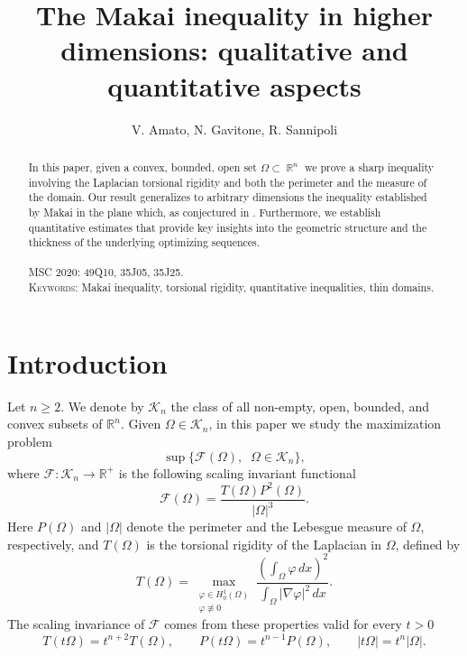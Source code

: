 \documentclass[oneside,a4paper,11pt,notitlepage]{article}
\title{The Makai inequality in higher dimensions: qualitative and quantitative aspects}
\author{V. Amato, N. Gavitone, R. Sannipoli}
\date{}
\theoremstyle{definition}
\theoremstyle{plain}
\theoremstyle{definition}
\DeclareMathOperator{\R}{\mathbb{R}}
\begin{document}
\maketitle
\begin{abstract} 
  In this paper, given a convex, bounded, open set $\Omega \subset \R^n$ we prove a sharp inequality involving the Laplacian torsional rigidity  and both the perimeter and the measure  of the domain. 
  Our result generalizes to arbitrary dimensions the inequality established by Makai in the plane which, as conjectured in \cite{buttazzo2020convex}. Furthermore, we establish quantitative  estimates that provide key insights into the geometric structure and the thickness of the underlying optimizing sequences.
  \\ \\
\textsc{MSC 2020:} 49Q10, 35J05, 35J25.\\
\textsc{Keywords:} Makai inequality, torsional rigidity, quantitative inequalities, thin domains.

\end{abstract}


\section{Introduction}
Let $n \geq 2$. We denote by $\mathcal{K}_n$ the class of all non-empty, open, bounded, and convex subsets of $\mathbb{R}^n$. Given $\Omega \in \mathcal{K}_n$, in this paper we study the maximization problem 
\begin{equation*}
\sup\{{\mathcal{F}(\Omega),\;\; \Omega \in \mathcal{K}_n}\},
\end{equation*}
where $\mathcal{F}:\mathcal{K}_n\to\mathbb R^+$ is the following scaling invariant functional
\begin{equation}
\label{mak_func}
\mathcal F(\Omega)=\frac{T(\Omega) P^2(\Omega)}{|\Omega|^3}.
\end{equation}
Here $P(\Omega)$ and $|\Omega|$ denote the perimeter and the Lebesgue measure of $\Omega$, respectively, and $T(\Omega)$ is the torsional rigidity of the Laplacian in $\Omega$, defined by
$$
T(\Omega) =  \max_{\substack{\varphi \in H^1_0(\Omega) \\ \varphi \not\equiv 0}} 
\frac{\displaystyle\left(\int_\Omega \varphi \, dx \right)^2}{\displaystyle \int_\Omega |\nabla \varphi|^2 \, dx}.
$$
The scaling invariance of $\mathcal F$ comes from these properties valid for every $t>0$
\[
T(t\Omega)= t^{n+2}T(\Omega), \qquad P(t\Omega) =t^{n-1}P(\Omega), \qquad |t\Omega|=t^n |\Omega|.
\]
\end{document}
